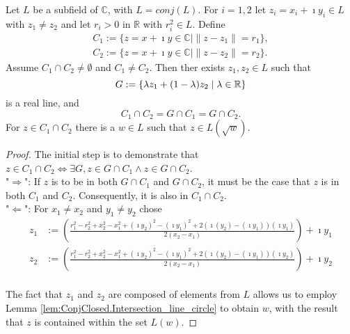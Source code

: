 \begin{lemma}
    \label{lem:ConjClosed.Intersection_circle_circle}
    Let $L$ be a subfield of $\mathbb{C}$, with $L = conj(L)$. For $i = 1,2 $ let $z_i = x_i + \imath y_i \in L$ with $z_1 \ne z_2$ and let $r_i > 0$ in $\mathbb{R}$ with $r_i^2 \in L$. Define
    \begin{equation*} \begin{aligned}
        C_1 := \{z = x + \imath y \in \mathbb{C} \mid \|z - z_1\| = r_1\},\\
        C_2 := \{z = x + \imath y \in \mathbb{C} \mid \|z - z_2\| = r_2\}.
    \end{aligned} \end{equation*}
    Assume $C_1 \cap C_2 \ne \emptyset$ and $C_1 \ne C_2$. Then  ther  exists $z_1, z_2 \in L$ such that
     $$G := \{ \lambda z_1 + (1-\lambda) z_2 \mid \lambda \in \mathbb{R} \}$$ %
    is a real line, and $$ C_1 \cap C_2 = G \cap C_1 = G \cap C_2. $$
    For $z \in C_1 \cap C_2$ there is a $w \in L$ such that $z \in L(\sqrt{w})$.
\end{lemma}
\begin{proof}
    The initial step is to demonstrate that $ z\in C_1 \cap C_2 \Leftrightarrow \exists G,  z\in G \cap C_1 \land z \in G \cap C_2$.\\
    "$\Rightarrow$": If $z$ is to be in both $G \cap C_1$ and $G \cap C_2$, it must be the case that $z$ is in both $C_1$ and $C_2$. Consequently, it is also in $C_1 \cap C_2$. \\
    "$\Leftarrow$": For $ x_1 \ne x_2$ and $y_1 \ne y_2$ chose 
        \begin{align*}
            z_1 &:= (\frac{r_1^2 - r_2^2 + x_2^2 - x_1^2 + (\imath y_2)^2 - (\imath y_1)^2+2(\imath (y_2)-(\imath y_1))(\imath y_1)}{2(x_2-x_1)}) + \imath y_1\\ %
            z_2 &:= (\frac{r_1^2 - r_2^2 + x_2^2 - x_1^2 + (\imath y_2)^2 - (\imath y_1)^2+2(\imath (y_2)-(\imath y_1))(\imath y_2)}{2(x_2-x_1)}) + \imath y_2\\
        \end{align*}

    The fact that $z_1$ and $z_2$ are composed of elements from $L$ allows us to employ Lemma \ref{lem:ConjClosed.Intersection_line_circle} to obtain $w$, with the result that $z$ is contained within the set $L(w)$.
\end{proof}

